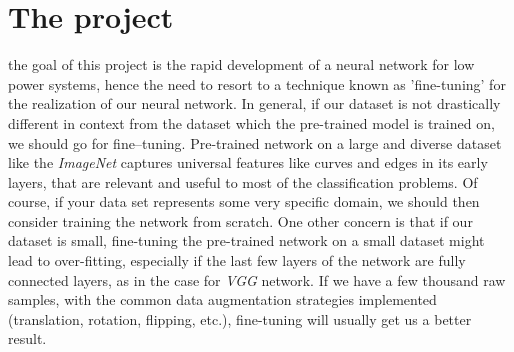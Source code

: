 

\section{The project}
\label{sec:project}
the goal of this project is the rapid development of a neural network for low 
power systems, hence the need to resort to a technique known as 
'fine-tuning' for the realization of our neural network.
In general, if our dataset is not drastically different in context from the 
dataset which the pre-trained model is trained on, we should go for 
fine--tuning.
Pre-trained network on a large and diverse dataset like the \emph{ImageNet} 
captures  universal features like curves and edges in its early layers, that are
relevant and useful to most of the classification problems.
Of course, if your data set represents some very specific domain, we should 
then consider training the network from scratch.
One other concern is that if our dataset is small, fine-tuning the pre-trained 
network on a small dataset might lead to over-fitting, especially if the last few 
layers of the network are fully connected layers, as in the case for \emph{VGG} 
network. 
If we have a few thousand raw samples, with the common data augmentation 
strategies implemented (translation, rotation, flipping, etc.), fine-tuning will 
usually get us a better result.
%
